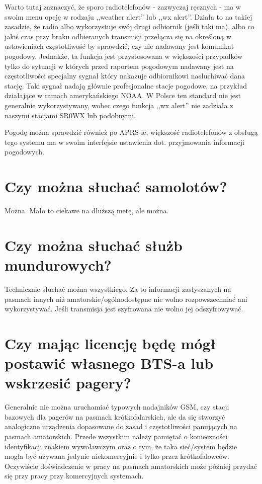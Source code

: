\documentclass[a4paper,12pt]{article}
\begin{document}
Warto tutaj zaznaczyć, że sporo radiotelefonów - zazwyczaj ręcznych - ma w swoim menu opcję w rodzaju ,,weather alert'' lub ,,wx alert''. Działa to na takiej zasadzie, że radio albo wykorzystuje swój drugi odbiornik (jeśli taki ma), albo co jakiś czas przy braku odbieranych transmisji przełącza się na określoną w ustawieniach częstotliwość by sprawdzić, czy nie nadawany jest komunikat pogodowy. Jednakże, ta funkcja jest przystosowana w większości przypadków tylko do sytuacji w których przed raportem pogodowym nadawany jest na częstotliwości specjalny sygnał który nakazuje odbiornikowi nasłuchiwać dana stację. Taki sygnał nadają głównie profesjonalne stacje pogodowe, na przykład działające w ramach amerykańskiego NOAA. W Polsce ten standard nie jest generalnie wykorzystywany, wobec czego funkcja ,,wx alert'' nie zadziała z naszymi stacjami SR0WX lub podobnymi.

Pogodę można sprawdzić również po APRS-ie, większość radiotelefonów z obsługą tego systemu ma w swoim interfejsie ustawienia dot. przyjmowania informacji pogodowych.

\section{Czy można słuchać samolotów?}
Można. Mało to ciekawe na dłuższą metę, ale można.

\section{Czy można słuchać służb mundurowych?}
Technicznie słuchać można wszystkiego. Za to informacji zasłyszanych na pasmach innych niż amatorskie/ogólnodostępne nie wolno rozpowszechniać ani wykorzystywać. Jeśli transmisja jest szyfrowana nie wolno jej odszyfrowywać.

\section{Czy mając licencję będę mógł postawić własnego BTS-a lub wskrzesić pagery?}
Generalnie nie można uruchamiać typowych nadajników GSM, czy stacji bazowych dla pagerów na pasmach krótkofalarskich, ale da się stworzyć analogiczne urządzenia dopasowane do zasad i częstotliwości panujących na pasmach amatorskich. Przede wszystkim należy pamiętać o konieczności identyfikacji znakiem wywoławczym oraz o tym, że taka sieć/system będzie mogła być używana jedynie niekomercyjnie i tylko przez krótkofalowców. Oczywiście doświadczenie w pracy na pasmach amatorskich może później przydać się przy pracy przy komercyjnych systemach.
\end{document}
